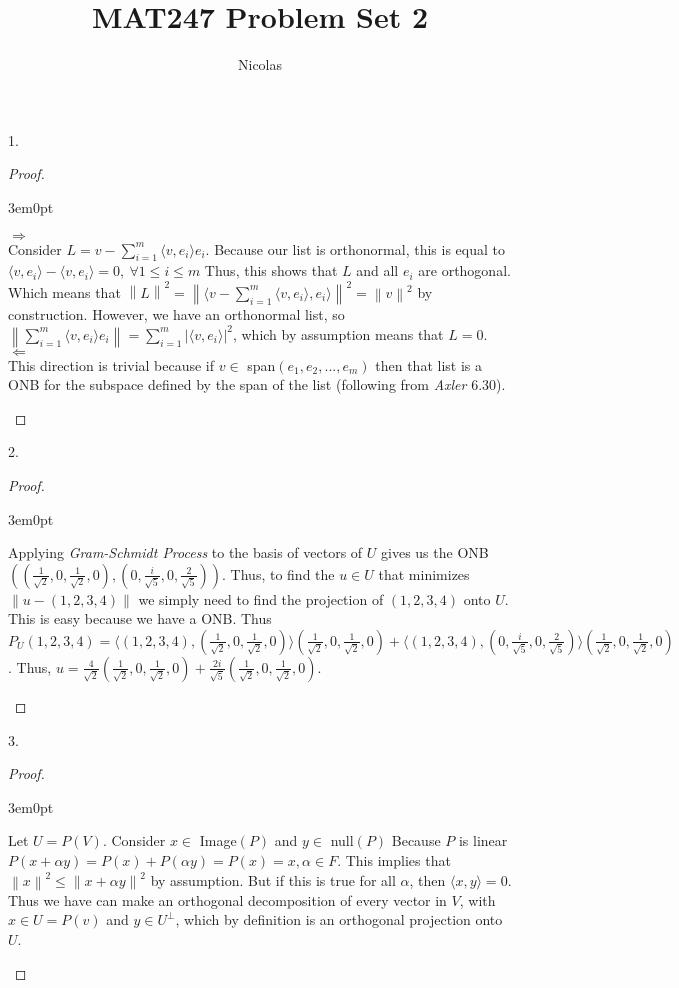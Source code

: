 \documentclass[11pt]{article}
\title{MAT247 Problem Set 2}
\author{Nicolas}
\newcommand{\norm}[1]{\left\lVert#1\right\rVert}
\newcommand{\inn}[2]{\langle#1,#2\rangle}
\newenvironment{myproof}
{\begin{proof} \begin{adjustwidth}{3em}{0pt}$ $\par\nobreak\ignorespaces}
{\end{adjustwidth} \end{proof}}
\begin{document}
\maketitle
\begin{flushleft}

1.

\begin{myproof}
$\Rightarrow$\\
\bigskip
Consider $L = v - \sum_{i=1}^m \inn{v}{e_i}e_i$. Because our list is orthonormal, this is equal to $\inn{v}{e_i} - \inn{v}{e_i} = 0, \ \forall 1 \leq i \leq m$ Thus, this shows that $L$ and all $e_i$ are orthogonal. Which means that $\norm{L}^2 = \norm{\inn{v - \sum_{i=1}^m \inn{v}{e_i}}{e_i}}^2 = \norm{v}^2$ by construction. However, we have an orthonormal list, so $\norm{\sum_{i=1}^m\inn{v}{e_i}e_i} = \sum_{i=1}^m | \inn{v}{e_i}|^2$, which by assumption means that $L = 0$.
\\
\bigskip
$\Leftarrow$\\
\bigskip
This direction is trivial because if $v \in$ span$(e_1,e_2,...,e_m)$ then that list is a ONB for the subspace defined by the span of the list (following from \textit{Axler} 6.30).
\end{myproof}
 
\newpage

2.

\begin{myproof}
Applying \textit{Gram-Schmidt Process} to the basis of vectors of $U$ gives us the ONB $((\frac{1}{\sqrt{2}},0,\frac{1}{\sqrt{2}},0),(0,\frac{i}{\sqrt{5}},0,\frac{2}{\sqrt{5}}))$. Thus, to find the $u \in U$ that minimizes $\norm{u - (1,2,3,4)}$ we simply need to find the projection of $(1,2,3,4)$ onto $U$. This is easy because we have a ONB. Thus $P_U(1,2,3,4) = \inn{(1,2,3,4)}{(\frac{1}{\sqrt{2}},0,\frac{1}{\sqrt{2}},0)} (\frac{1}{\sqrt{2}},0,\frac{1}{\sqrt{2}},0) + \inn{(1,2,3,4)}{(0,\frac{i}{\sqrt{5}},0,\frac{2}{\sqrt{5}})} (\frac{1}{\sqrt{2}},0,\frac{1}{\sqrt{2}},0)$. Thus, $u = \frac{4}{\sqrt{2}}(\frac{1}{\sqrt{2}},0,\frac{1}{\sqrt{2}},0) + \frac{2i}{\sqrt{5}} (\frac{1}{\sqrt{2}},0,\frac{1}{\sqrt{2}},0)$.
\end{myproof}

\newpage

3.

\begin{myproof}
Let $U = P(V)$. Consider $x \in$ Image$(P)$ and $y \in $ null$(P)$ Because $P$ is linear $P(x+ \alpha y) = P(x) + P(\alpha y) = P(x) = x, \alpha \in F$. This implies that $\norm{x}^2 \leq \norm{x + \alpha y}^2$ by assumption. But if this is true for all $\alpha$, then $\inn{x}{y} = 0$. Thus we have can make an orthogonal decomposition of every vector in $V$, with $x \in U = P(v)$ and $y \in U^\perp$, which by definition is an orthogonal projection onto $U$.
\end{myproof}


\end{flushleft}
\end{document}

